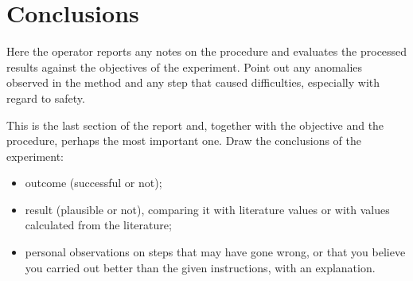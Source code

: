 \section{Conclusions}
Here the operator reports any notes on the procedure and evaluates the processed results against the objectives of the experiment. Point out any anomalies observed in the method and any step that caused difficulties, especially with regard to safety.

This is the last section of the report and, together with the objective and the procedure, perhaps the most important one. Draw the conclusions of the experiment:
\begin{itemize}
    \item outcome (successful or not);
    \item result (plausible or not), comparing it with literature values or with values calculated from the literature;
    \item personal observations on steps that may have gone wrong, or that you believe you carried out better than the given instructions, with an explanation.
\end{itemize}
